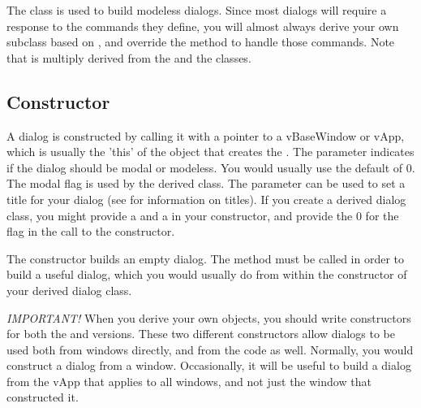The  class is used to build modeless dialogs. Since
most dialogs will require a response to the commands they define,
you will almost always derive your own subclass based on ,
and override the  method to handle those
commands. Note that  is multiply derived from the
 and the  classes.

\subsection* {Constructor} %


A dialog is constructed by calling it with a pointer to a
vBaseWindow or vApp, which is usually the 'this' of the object that
creates the . The  parameter
indicates if the dialog should be modal or modeless. You would
usually use the default of 0. The modal flag is used by the
derived  class. The  parameter can
be used to set a title for your dialog (see 
for information on titles). If you create a derived dialog class,
you might provide a  and a  in your
constructor, and provide the 0 for the  flag in the
call to the  constructor.

The constructor builds an empty dialog. The 
method must be called in order to build a useful dialog, which
you would usually do from within the constructor of your derived
dialog class.

\emph{IMPORTANT!} When you derive your own  objects,
you should write constructors for both the  and
 versions. These two different constructors allow
dialogs to be used both from windows directly, and from the
 code as well. Normally, you would construct a dialog
from a window. Occasionally, it will be useful to build a dialog
from the vApp that applies to all windows, and not just the window
that constructed it.

   
